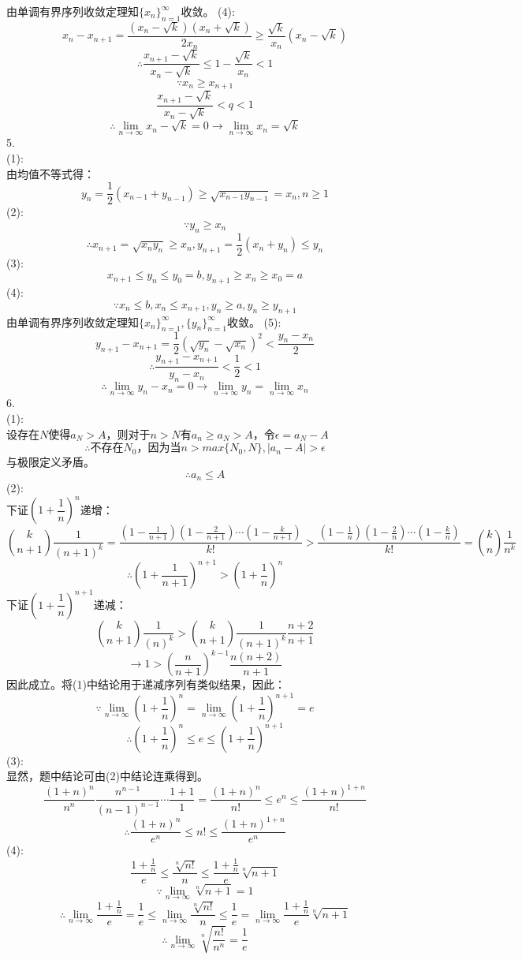 \documentclass[utf8]{ctexart}
\begin{document}
由单调有界序列收敛定理知$\{x_n\}_{n=1}^{\infty}$收敛。
(4):\\
\[x_n-x_{n+1}=\frac{(x_n-\sqrt{k})(x_n+\sqrt{k})}{2x_n}\ge\frac{\sqrt{k}}{x_n}(x_n-\sqrt{k})\]
\[\therefore\frac{x_{n+1}-\sqrt{k}}{x_n-\sqrt{k}}\le1-\frac{\sqrt{k}}{x_n}<1\]
\[\because x_n\ge x_{n+1}\]
\[\frac{x_{n+1}-\sqrt{k}}{x_n-\sqrt{k}}<q<1\]
\[\therefore\lim_{n\rightarrow\infty}x_n-\sqrt{k}=0\rightarrow\lim_{n\rightarrow\infty}x_n=\sqrt{k}\]
5.\\
(1):\\
由均值不等式得：
\[y_n=\frac{1}{2}(x_{n-1}+y_{n-1})\ge\sqrt{x_{n-1}y_{n-1}}=x_n,n\ge1\]
(2):\\
\[\because y_n\ge x_n\]
\[\therefore x_{n+1}=\sqrt{x_ny_n}\ge x_n,y_{n+1}=\frac{1}{2}(x_n+y_n)\le y_n\]
(3):\\
\[x_{n+1}\le y_n\le y_0=b,y_{n+1}\ge x_n\ge x_0=a\]
(4):\\
\[\because x_n\le b,x_n\le x_{n+1},y_n\ge a,y_n\ge y_{n+1}\]
由单调有界序列收敛定理知$\{x_n\}_{n=1}^{\infty},\{y_n\}_{n=1}^{\infty}$收敛。
(5):\\
\[y_{n+1}-x_{n+1}=\frac{1}{2}(\sqrt{y_n}-\sqrt{x_n})^2<\frac{y_n-x_n}{2}\]
\[\therefore\frac{y_{n+1}-x_{n+1}}{y_n-x_n}<\frac{1}{2}<1\]
\[\therefore\lim_{n\rightarrow\infty}y_n-x_n=0\rightarrow\lim_{n\rightarrow\infty}y_n=\lim_{n\rightarrow\infty}x_n\]
6.\\
(1):\\
设存在$N$使得$a_N>A$，则对于$n>N$有$a_n\ge a_N>A$，令$\epsilon=a_N-A$
\[\therefore\text{不存在}N_0\text{，因为当}n>max\{N_0,N\},|a_n-A|>\epsilon\]
与极限定义矛盾。
\[\therefore a_n\le A\]
(2):\\
下证$(1+\dfrac{1}{n})^n$递增：
\[\binom{k}{n+1}\frac{1}{(n+1)^k}=\frac{(1-\frac{1}{n+1})(1-\frac{2}{n+1})\cdots(1-\frac{k}{n+1})}{k!}>\frac{(1-\frac{1}{n})(1-\frac{2}{n})\cdots(1-\frac{k}{n})}{k!}=\binom{k}{n}\frac{1}{n^k}\]
\[\therefore(1+\frac{1}{n+1})^{n+1}>(1+\frac{1}{n})^n\]
下证$(1+\dfrac{1}{n})^{n+1}$递减：
\[\binom{k}{n+1}\frac{1}{(n)^k}>\binom{k}{n+1}\frac{1}{(n+1)^k}\frac{n+2}{n+1}\]
\[\rightarrow1>(\frac{n}{n+1})^{k-1}\frac{n(n+2)}{n+1}\]
因此成立。将(1)中结论用于递减序列有类似结果，因此：
\[\because\lim_{n\rightarrow\infty}(1+\frac{1}{n})^n=\lim_{n\rightarrow\infty}(1+\frac{1}{n})^{n+1}=e\]
\[\therefore(1+\frac{1}{n})^n\le e\le(1+\frac{1}{n})^{n+1}\]
(3):\\
显然，题中结论可由(2)中结论连乘得到。
\[\frac{(1+n)^n}{n^n}\frac{n^{n-1}}{(n-1)^{n-1}}\cdots\frac{1+1}{1}=\frac{(1+n)^n}{n!}\le e^n\le\frac{(1+n)^{1+n}}{n!}\]
\[\therefore\frac{(1+n)^n}{e^n}\le n!\le\frac{(1+n)^{1+n}}{e^n}\]
(4):\\
\[\frac{1+\frac{1}{n}}{e}\le\frac{\sqrt[n]{n!}}{n}\le\frac{1+\frac{1}{n}}{e}\sqrt[n]{n+1}\]
\[\because\lim_{n\rightarrow\infty}\sqrt[n]{n+1}=1\]
\[\therefore\lim_{n\rightarrow\infty}\frac{1+\frac{1}{n}}{e}=\frac{1}{e}\le\lim_{n\rightarrow\infty}\frac{\sqrt[n]{n!}}{n}\le\frac{1}{e}=\lim_{n\rightarrow\infty}\frac{1+\frac{1}{n}}{e}\sqrt[n]{n+1}\]
\[\therefore\lim_{n\rightarrow\infty}\sqrt[n]{\frac{n!}{n^n}}=\frac{1}{e}\]
\end{document}
